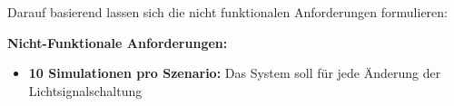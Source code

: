Darauf basierend lassen sich die nicht funktionalen Anforderungen formulieren:

\textbf{Nicht-Funktionale Anforderungen:}

\begin{itemize}
    \item \textbf{10 Simulationen pro Szenario:} Das System soll für jede Änderung der Lichtsignalschaltung
\end{itemize}
